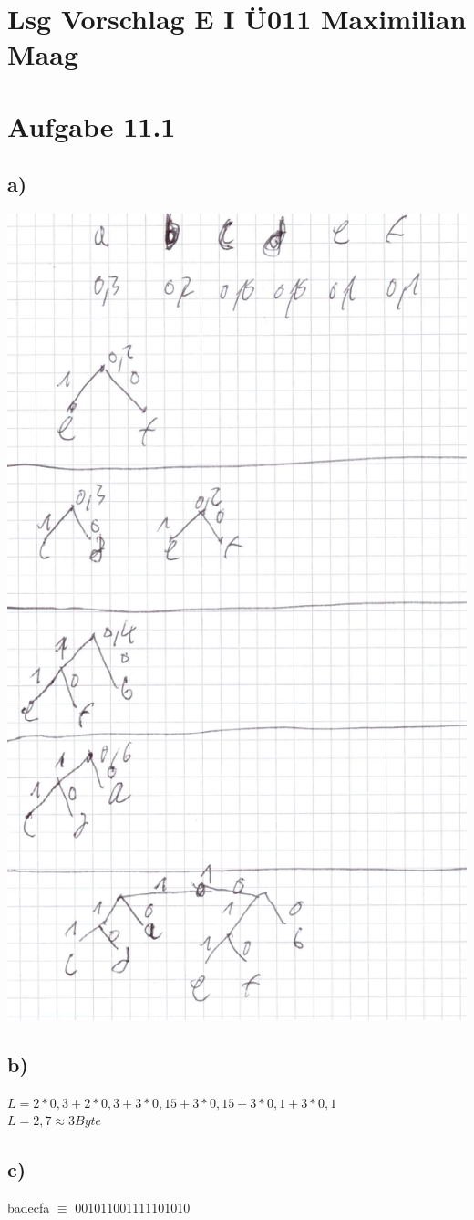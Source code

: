 \documentclass{article}
\begin{document}
	\section*{Lsg Vorschlag E I Ü011 Maximilian Maag}
	\section*{Aufgabe 11.1}
	\subsection*{a)}
	\includegraphics[width=\linewidth, height=\linewidth]{111a}
	\subsection*{b)}
	$L = 2*0,3 + 2*0,3 + 3*0,15 + 3*0,15 + 3*0,1 + 3*0,1$ \\
	$L = 2,7 \approx 3 Byte$
	\subsection*{c)}
	badecfa $\equiv$ 001011001111101010
\end{document}
